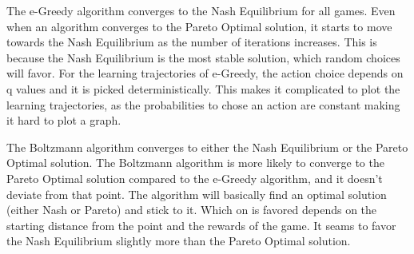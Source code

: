 \documentclass[12pt,letterpaper, onecolumn]{exam}
\begin{document}
The e-Greedy algorithm converges to the Nash Equilibrium for all games. Even when an algorithm converges to the Pareto Optimal solution, it starts to move towards the Nash Equilibrium
as the number of iterations increases. This is because the Nash Equilibrium is the most stable solution, which random choices will favor. For the learning trajectories of e-Greedy,
the action choice depends on q values and it is picked deterministically. This makes it complicated to plot the learning trajectories, as the probabilities to chose an action are 
constant making it hard to plot a graph. 

The Boltzmann algorithm converges to either the Nash Equilibrium or the Pareto Optimal solution. The Boltzmann algorithm is more likely to converge to the Pareto Optimal solution
compared to the e-Greedy algorithm, and it doesn't deviate from that point. The algorithm will basically find an optimal solution (either Nash or Pareto) and stick to it.
Which on is favored depends on the starting distance from the point and the rewards of the game. It seams to favor the Nash Equilibrium slightly more than the Pareto Optimal solution.
\end{document}
